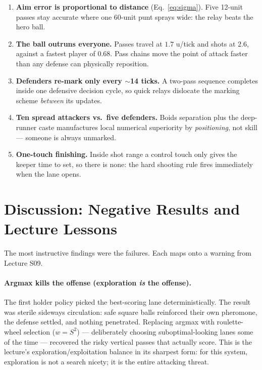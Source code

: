 \documentclass[11pt,a4paper]{article}
\begin{document}
\begin{enumerate}[itemsep=2pt]
  \item \textbf{Aim error is proportional to distance} (Eq.~\eqref{eq:sigma}). Five 12-unit
        passes stay accurate where one 60-unit punt sprays wide: the relay beats the hero ball.
  \item \textbf{The ball outruns everyone.} Passes travel at $1.7$ u/tick and shots at $2.6$,
        against a fastest player of $0.68$. Pass chains move the point of attack faster than any
        defense can physically reposition.
  \item \textbf{Defenders re-mark only every $\sim$14 ticks.} A two-pass sequence completes
        inside one defensive decision cycle, so quick relays dislocate the marking scheme
        \emph{between} its updates.
  \item \textbf{Ten spread attackers vs.\ five defenders.} Boids separation plus the deep-runner
        caste manufactures local numerical superiority by \emph{positioning}, not skill ---
        someone is always unmarked.
  \item \textbf{One-touch finishing.} Inside shot range a control touch only gives the keeper
        time to set, so there is none: the hard shooting rule fires immediately when the lane
        opens.
\end{enumerate}

\section{Discussion: Negative Results and Lecture Lessons}\label{sec:discussion}

The most instructive findings were the failures. Each maps onto a warning from Lecture S09.

\paragraph{Argmax kills the offense (exploration \emph{is} the offense).} The first holder
policy picked the best-scoring lane deterministically. The result was sterile sideways
circulation: safe square balls reinforced their own pheromone, the defense settled, and nothing
penetrated. Replacing argmax with roulette-wheel selection ($w = S^2$) --- deliberately choosing
suboptimal-looking lanes some of the time --- recovered the risky vertical passes that actually
score. This is the lecture's exploration/exploitation balance in its sharpest form: for this
system, exploration is not a search nicety; it is the entire attacking threat.
\end{document}
